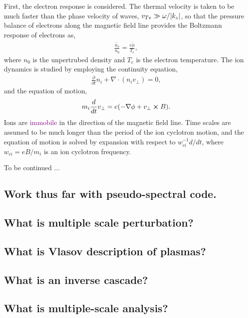 First, the electron response is considered. The thermal velocity is taken to be much faster than the phase velocity of waves, $v_{Te} \gg \omega/\abs{k_z}$, so that the pressure balance of electrons along the magnetic field line provides the Boltzmann response of electrons as, 
\begin{align}
	\frac{\tilde{n_e}}{n_0} = \frac{e \tilde{\phi}}{T_e},
\end{align}
where $n_0$ is the unpertrubed density and $T_e$ is the electron temperature. The ion dynamics is studied by employing the continuity equation, 
\begin{align}
	\frac{\partial }{\partial t} n_i + \nabla \cdot (n_i v_{\perp}) = 0,
\end{align}
and the equation of motion, 
\begin{align}
	m_i \frac{d}{d t} v_{\perp} = e (- \nabla \phi + v_{\perp} \cross B).
\end{align}
Ions are \textcolor{purple}{immobile} in the direction of the magnetic field line. Time scales are assumed to be much longer than the period of the ion cyclotron motion, and the equation of motion is solved by expansion with respect to $w_{ci}^{-1} d/dt$, where $w_{ci} = eB/m_i$ is an ion cyclotron frequency. 

To be continued \cite{diamond_itoh_itoh_2010}...

\subsection{Work thus far with pseudo-spectral code.}

\subsection{What is multiple scale perturbation?}

\subsection{What is Vlasov description of plasmas?}

\subsection{What is an inverse cascade?}

\subsection{What is multiple-scale analysis?}

